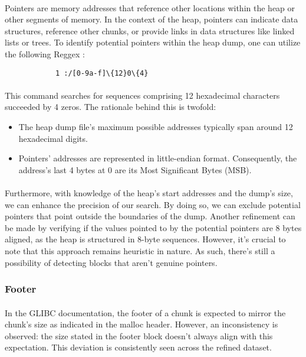             \paragraph{}Pointers are memory addresses that reference other locations within the heap or other segments of memory. In the context of the heap, pointers can indicate data structures, reference other chunks, or provide links in data structures like linked lists or trees. To identify potential pointers within the heap dump, one can utilize the following Reggex :
            \begin{lstlisting}
            1 :/[0-9a-f]\{12}0\{4}
            \end{lstlisting}

            \paragraph{}This command searches for sequences comprising 12 hexadecimal characters succeeded by 4 zeros. The rationale behind this is twofold: 
            \begin{itemize}
                \item The heap dump file's maximum possible addresses typically span around 12 hexadecimal digits.
                \item Pointers' addresses are represented in little-endian format. Consequently, the address's last 4 bytes at 0 are its Most Significant Bytes (MSB).
            \end{itemize}
            \paragraph{}Furthermore, with knowledge of the heap's start addresses and the dump's size, we can enhance the precision of our search. By doing so, we can exclude potential pointers that point outside the boundaries of the dump. Another refinement can be made by verifying if the values pointed to by the potential pointers are 8 bytes aligned, as the heap is structured in 8-byte sequences. However, it's crucial to note that this approach remains heuristic in nature. As such, there's still a possibility of detecting blocks that aren't genuine pointers.
        \subsubsection{Footer}
            \paragraph{}In the GLIBC documentation, the footer of a chunk is expected to mirror the chunk's size as indicated in the malloc header. However, an inconsistency is observed: the size stated in the footer block doesn't always align with this expectation. This deviation is consistently seen across the refined dataset.
    

